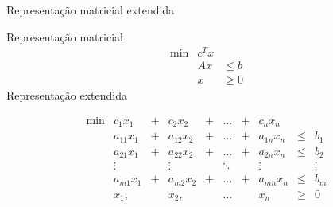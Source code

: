 \documentclass[compress,mathserif]{beamer}
\begin{document}

\begin{frame}{Representação matricial extendida}

Representação matricial
    $$\begin{matrix}
        \min & c^Tx \\ 
             & Ax & \leqslant b \\
             & x & \geqslant 0 
        \end{matrix}    
$$
Representação extendida

$$
\begin{matrix} 
\min & c_1 x_1 & + & c_2 x_2 & + & \dots & + & c_n x_n & \\
     & a_{11} x_1 & + & a_{12} x_2 & + & \dots  & + & a_{1n} x_n & \leqslant & b_1 \\
     & a_{21} x_1 & + & a_{22} x_2 & + & \dots  & + & a_{2n} x_n & \leqslant & b_2 \\
     & \vdots     &   & \vdots     &   & \ddots &   & \vdots     &           & \vdots \\
     & a_{m1} x_1 & + & a_{m2} x_2 & + & \dots  & + & a_{mn} x_n & \leqslant & b_m \\
     & x_1,       &   & x_2,       &   & \dots  &   &        x_n & \geqslant & 0 \\
\end{matrix}
$$
\end{frame}

\end{document}
